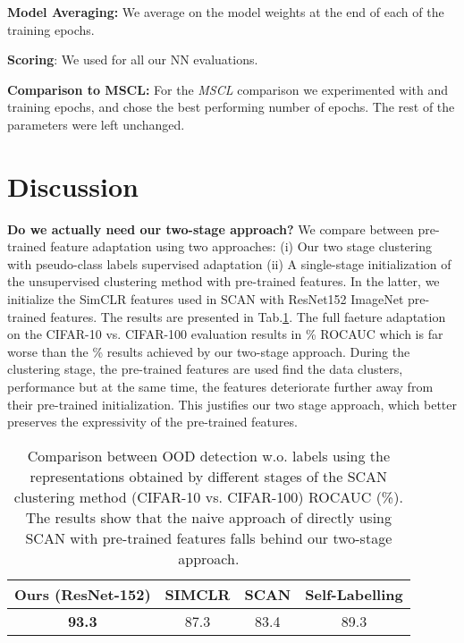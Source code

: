 \documentclass[runningheads]{llncs}
\begin{document}
\noindent\textbf{Model Averaging:} We average on the model weights at the end of each of the  training epochs.

\noindent\textbf{Scoring}: We used  for all our NN evaluations.

\noindent\textbf{Comparison to MSCL:} For the \textit{MSCL} comparison we experimented with  and  training epochs, and chose the best performing number of epochs. The rest of the parameters were left unchanged. 





\section{Discussion}
\label{sec:discussion}
\textbf{Do we actually need our two-stage approach?} We compare between pre-trained feature adaptation using two approaches: (i) Our two stage clustering with pseudo-class labels supervised adaptation (ii) A single-stage initialization of the unsupervised clustering method with pre-trained features. In the latter, we initialize the SimCLR features used in SCAN with ResNet152 ImageNet pre-trained features. The results are presented in Tab.\ref{tab:scan_stages_comparison}. The full faeture adaptation on the CIFAR-10 vs. CIFAR-100 evaluation results in \% ROCAUC 
which is far worse than the \% results achieved by our two-stage approach. During the clustering stage, the pre-trained features are used find the data clusters, performance but at the same time, the features deteriorate further away from their pre-trained initialization.
This justifies our two stage approach, which better preserves the expressivity of the pre-trained features. 


\begin{table}[h]
\begin{center}
\caption{Comparison between OOD detection w.o. labels using the representations obtained by different stages of the SCAN clustering method (CIFAR-10 vs. CIFAR-100) ROCAUC (\%). The results show that the naive approach of directly using SCAN with pre-trained features falls behind our two-stage approach.	}
\begin{tabular}{cccc}
\toprule
	Ours  (ResNet-152) &	SIMCLR	&	SCAN & Self-Labelling		\\
\midrule									
	\textbf{93.3} & 87.3	&	83.4 	&	89.3	\\


\bottomrule
\end{tabular}
\label{tab:scan_stages_comparison}

\end{center}
\end{table}
\end{document}
